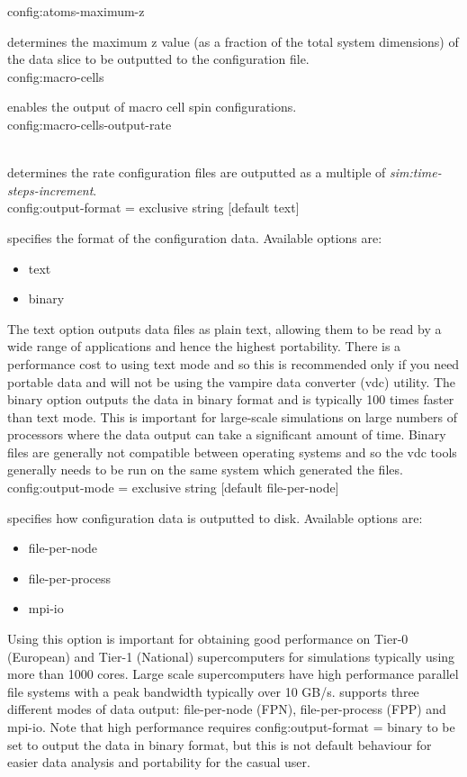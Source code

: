 {\zicf config:atoms-maximum-z}
determines the maximum z value (as a fraction of the total system dimensions)
of the data slice to be outputted to the configuration file.\\

{\zicf config:macro-cells}
enables the output of macro cell spin configurations.\\

{\zicf config:macro-cells-output-rate}\\
determines the rate configuration files are outputted as a multiple of \textit{sim:time-steps-increment}.\\

{\zicf config:output-format = exclusive string [default text]}
specifies the format of the configuration data. Available options are:
\begin{itemize}
  \item[] text
  \item[] binary
\end{itemize}
The text option outputs data files as plain text, allowing them to be read by
a wide range of applications and hence the highest portability. There is a
performance cost to using text mode and so this is recommended only if you need
portable data and will not be using the vampire data converter (vdc) utility. The
binary option outputs the data in binary format and is typically 100 times
faster than text mode. This is important for large-scale simulations on large
numbers of processors where the data output can take a significant amount of
time. Binary files are generally not compatible between operating systems and so
the vdc tools generally needs to be run on the same system which generated the
files.\\

{\zicf config:output-mode = exclusive string [default file-per-node]}
specifies how configuration data is outputted to disk.
Available options are:
\begin{itemize}
  \item[] file-per-node
  \item[] file-per-process
  \item[] mpi-io
\end{itemize}
Using this option is important for obtaining good performance on Tier-0
(European) and Tier-1 (National) supercomputers for simulations typically using
more than 1000 cores. Large scale supercomputers have high performance parallel
file systems with a peak bandwidth typically over 10 GB/s. \vampire supports
three different modes of data output: file-per-node (FPN), file-per-process
(FPP) and mpi-io. Note that high performance requires
config:output-format = binary to be set to output the data in binary format, but
this is not default behaviour for easier data analysis and portability for the
casual user.

